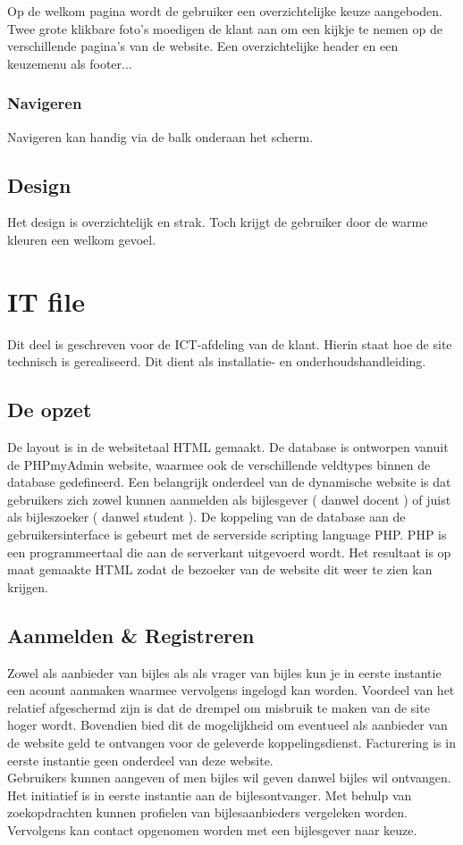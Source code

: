 \documentclass{report}
\begin{document}
            Op de welkom pagina wordt de gebruiker een overzichtelijke keuze aangeboden. Twee grote klikbare foto's moedigen de klant aan om een kijkje te nemen op de verschillende pagina's van de website. Een overzichtelijke header en een keuzemenu als footer...
        
            \subsection{Navigeren}
                Navigeren kan handig via de balk onderaan het scherm. 
        
        \section{Design}
            Het design is overzichtelijk en strak. Toch krijgt de gebruiker door de warme kleuren een welkom gevoel.

    \chapter{IT file}
        Dit deel is geschreven voor de ICT-afdeling van de klant. Hierin staat hoe de site technisch is gerealiseerd. Dit dient als installatie- en onderhoudshandleiding.
        
        \section{De opzet}
            De layout is in de websitetaal HTML gemaakt. De database is ontworpen vanuit de PHPmyAdmin website, waarmee ook de verschillende veldtypes binnen de database gedefineerd. Een belangrijk onderdeel van de dynamische website is dat gebruikers zich zowel kunnen aanmelden als bijlesgever ( danwel docent ) of juist als bijleszoeker ( danwel student ). De koppeling van de database aan de gebruikersinterface is gebeurt met de serverside scripting language PHP. PHP is een programmeertaal die aan de serverkant uitgevoerd wordt. Het resultaat is op maat gemaakte HTML zodat de bezoeker van de website dit weer te zien kan krijgen.

        \section{Aanmelden \& Registreren}
            Zowel als aanbieder van bijles als als vrager van bijles kun je in eerste instantie een acount aanmaken waarmee vervolgens ingelogd kan worden. Voordeel van het relatief afgeschermd zijn is dat de drempel om misbruik te maken van de site hoger wordt. Bovendien bied dit de mogelijkheid om eventueel als aanbieder van de website geld te ontvangen voor de geleverde koppelingsdienst. Facturering is in eerste instantie geen onderdeel van deze website.\\
            Gebruikers kunnen aangeven of men bijles wil geven danwel bijles wil ontvangen. Het initiatief is in eerste instantie aan de bijlesontvanger. Met behulp van zoekopdrachten kunnen profielen van bijlesaanbieders vergeleken worden. Vervolgens kan contact opgenomen worden met een bijlesgever naar keuze. 
        
\end{document}
